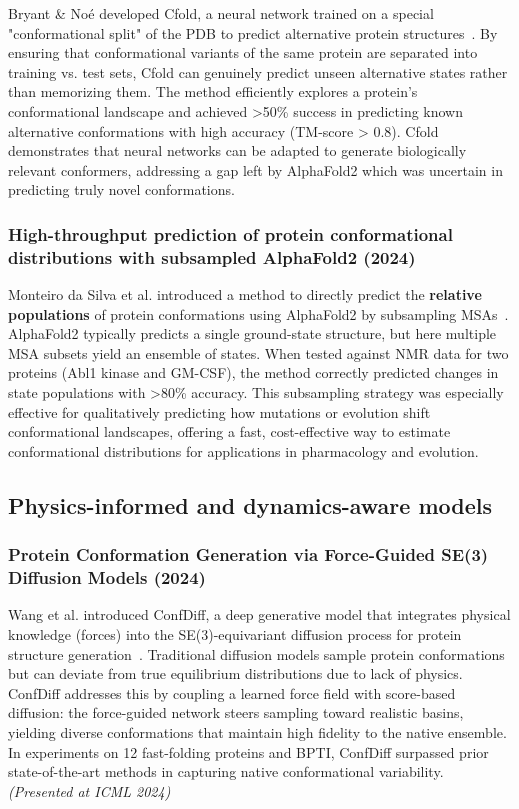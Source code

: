Bryant \& Noé developed Cfold, a neural network trained on a special "conformational split" of the PDB to predict alternative protein structures~\cite{Bryant2024Cfold}.
By ensuring that conformational variants of the same protein are separated into training vs.
test sets, Cfold can genuinely predict unseen alternative states rather than memorizing them.
The method efficiently explores a protein's conformational landscape and achieved >50\% success in predicting known alternative conformations with high accuracy (TM-score > 0.8).
Cfold demonstrates that neural networks can be adapted to generate biologically relevant conformers, addressing a gap left by AlphaFold2 which was uncertain in predicting truly novel conformations.

\subsubsection{High-throughput prediction of protein conformational distributions with subsampled AlphaFold2 (2024)}

Monteiro da Silva et al.
introduced a method to directly predict the \textbf{relative populations} of protein conformations using AlphaFold2 by subsampling MSAs~\cite{MonteiroSilva2024SubsampledAF2}.
AlphaFold2 typically predicts a single ground-state structure, but here multiple MSA subsets yield an ensemble of states.
When tested against NMR data for two proteins (Abl1 kinase and GM-CSF), the method correctly predicted changes in state populations with >80\% accuracy.
This subsampling strategy was especially effective for qualitatively predicting how mutations or evolution shift conformational landscapes, offering a fast, cost-effective way to estimate conformational distributions for applications in pharmacology and evolution.

\subsection{Physics-informed and dynamics-aware models}

\subsubsection{Protein Conformation Generation via Force-Guided SE(3) Diffusion Models (2024)}

Wang et al.
introduced ConfDiff, a deep generative model that integrates physical knowledge (forces) into the SE(3)-equivariant diffusion process for protein structure generation~\cite{Wang2024ConfDiff}.
Traditional diffusion models sample protein conformations but can deviate from true equilibrium distributions due to lack of physics.
ConfDiff addresses this by coupling a learned force field with score-based diffusion: the force-guided network steers sampling toward realistic basins, yielding diverse conformations that maintain high fidelity to the native ensemble.
In experiments on 12 fast-folding proteins and BPTI, ConfDiff surpassed prior state-of-the-art methods in capturing native conformational variability. \textit{(Presented at ICML 2024)}

